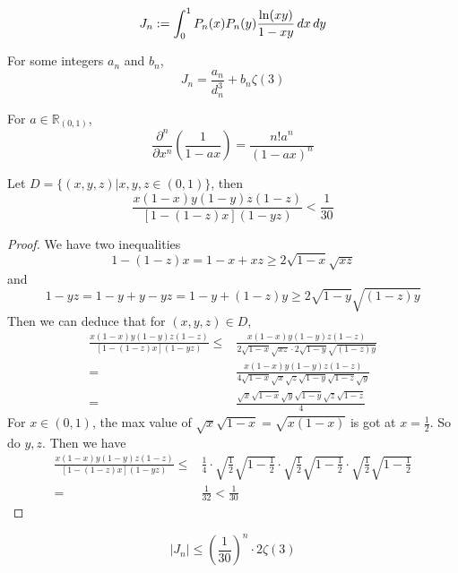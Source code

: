 \begin{definition}\label{J_n}
    \[ J_n := \int_{0}^{1} P_n(x)P_n(y)\frac{{\rm ln}(xy)}{1-xy} \, dx \, dy \]
\end{definition}

\begin{lemma}\label{J_n_integers_an_bn}
    For some integers $a_n$ and $b_n$,
    \[ J_n = \frac{a_n}{d_n^3} + b_n\zeta(3) \]
\end{lemma}

\begin{lemma}\label{frac_partial_n}
    For $a \in \mathbb{R}_{(0,1)}$,
    \[ \frac{\partial^n}{\partial x^n}(\frac{1}{1-ax}) = \frac{n!a^n}{(1-ax)^n} \]
\end{lemma}

\begin{lemma}\label{bound}
    Let $D = \{(x,y,z)|x,y,z\in (0,1)\}$, then
    \[ \frac{x(1-x)y(1-y)z(1-z)}{[1-(1-z)x](1-yz)} < \frac{1}{30} \]
\end{lemma}
\begin{proof}
    We have two inequalities
    \[ 1-(1-z)x = 1-x+xz \geqslant 2\sqrt{1-x}\sqrt{xz} \]
    and
    \[ 1-yz= 1-y+y-yz = 1-y+(1-z)y \geqslant 2\sqrt{1-y}\sqrt{(1-z)y} \]
    Then we can deduce that for $(x,y,z) \in D$,
    \begin{align*}
        \frac{x(1-x)y(1-y)z(1-z)}{[1-(1-z)x](1-yz)} \leqslant& \frac{x(1-x)y(1-y)z(1-z)}{2\sqrt{1-x}\sqrt{xz}\cdot2\sqrt{1-y}\sqrt{(1-z)y}}\\
        =&\frac{x(1-x)y(1-y)z(1-z)}{4\sqrt{1-x}\sqrt{x}\sqrt{z}\sqrt{1-y}\sqrt{1-z}\sqrt{y}}\\
        =&\frac{\sqrt{x}\sqrt{1-x}\sqrt{y}\sqrt{1-y}\sqrt{z}\sqrt{1-z}}{4}
    \end{align*}
    For $x\in (0,1)$, the max value of $\sqrt{x}\sqrt{1-x} = \sqrt{x(1-x)}$ is got at $x=\frac{1}{2}$. So do $y, z$.
    Then we have
    \begin{align*}
        \frac{x(1-x)y(1-y)z(1-z)}{[1-(1-z)x](1-yz)} \leqslant& \frac{1}{4}\cdot\sqrt{\frac{1}{2}}\sqrt{1-\frac{1}{2}}\cdot\sqrt{\frac{1}{2}}\sqrt{1-\frac{1}{2}}\cdot\sqrt{\frac{1}{2}}\sqrt{1-\frac{1}{2}} \\
        =& \frac{1}{32} < \frac{1}{30} 
    \end{align*}
\end{proof}

\begin{lemma}\label{Jn_abs_upper}
    \[ |J_n| \leqslant (\frac{1}{30})^n\cdot 2\zeta(3) \]
\end{lemma}

